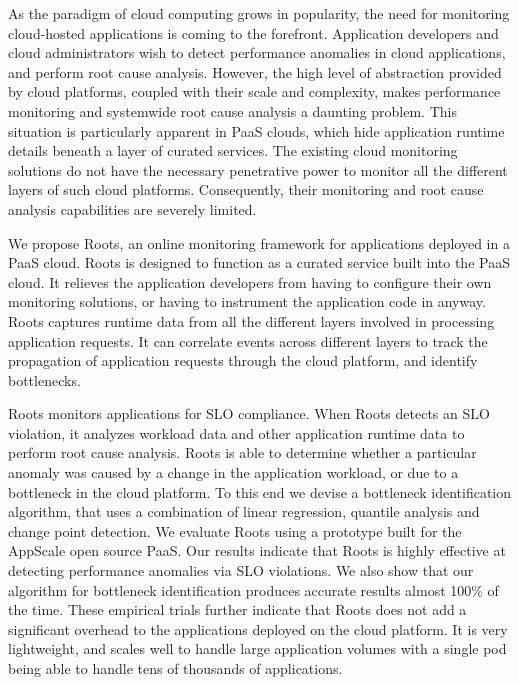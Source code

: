 As the paradigm of cloud computing grows in popularity, the need for monitoring cloud-hosted 
applications is coming to the forefront. Application developers and cloud administrators
wish to detect performance anomalies in cloud applications, and
perform root cause analysis. However, the high level of abstraction provided by cloud
platforms, coupled with their scale and complexity, makes performance monitoring and
systemwide root cause analysis a daunting problem. This situation is particularly apparent in
PaaS clouds, which hide application runtime details beneath a layer of curated services.
The existing cloud monitoring solutions do not have the necessary penetrative power
to monitor all the different layers of such cloud platforms. Consequently, their monitoring
and root cause analysis capabilities are severely limited.

We propose Roots, an online monitoring framework for applications deployed in a PaaS cloud. 
Roots is designed to function as a curated service
built into the PaaS cloud. It relieves the application developers from having to configure
their own monitoring solutions, or having to instrument the application code in anyway.
Roots captures runtime data from all the different layers involved
in processing application requests. It can correlate events across different layers
to track the propagation of application requests through the cloud platform, and
identify bottlenecks.

Roots monitors applications for SLO compliance. When Roots detects an SLO violation, 
it analyzes workload data and other application runtime data
to perform root cause analysis. Roots is able to determine whether a particular
anomaly was caused by a change in the application workload, or due to a bottleneck
in the cloud platform. To this end we devise a bottleneck identification algorithm, that
uses a combination of linear regression, quantile analysis and change point detection.
We evaluate Roots using a prototype built for the AppScale open source PaaS. 
Our results indicate that Roots is highly effective at detecting performance anomalies
via SLO violations. We also show that our algorithm for bottleneck identification
produces accurate results almost 100\% of the time. These empirical trials further 
indicate that Roots does not add a significant overhead to the applications deployed
on the cloud platform. It is very lightweight, and scales well to handle large application
volumes with a single pod being able to handle tens of thousands of applications.
